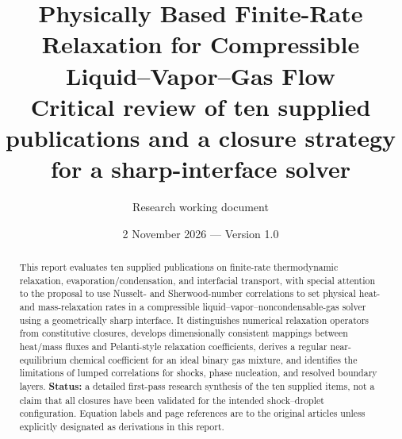 \documentclass[11pt,letterpaper]{article}
\title{\textbf{Physically Based Finite-Rate Relaxation for Compressible Liquid--Vapor--Gas Flow}\\[0.5em]
\large Critical review of ten supplied publications and a closure strategy for a sharp-interface solver}
\author{Research working document}
\date{2 November 2026 \quad --- \quad Version 1.0}
\begin{document}
\maketitle
\begin{abstract}
This report evaluates ten supplied publications on finite-rate thermodynamic relaxation, evaporation/condensation, and interfacial transport, with special attention to the proposal to use Nusselt- and Sherwood-number correlations to set physical heat- and mass-relaxation rates in a compressible liquid--vapor--noncondensable-gas solver using a geometrically sharp interface. It distinguishes numerical relaxation operators from constitutive closures, develops dimensionally consistent mappings between heat/mass fluxes and Pelanti-style relaxation coefficients, derives a regular near-equilibrium chemical coefficient for an ideal binary gas mixture, and identifies the limitations of lumped correlations for shocks, phase nucleation, and resolved boundary layers. \textbf{Status:} a detailed first-pass research synthesis of the ten supplied items, not a claim that all closures have been validated for the intended shock--droplet configuration. Equation labels and page references are to the original articles unless explicitly designated as derivations in this report.
\end{abstract}
\tableofcontents
\clearpage
\end{document}
